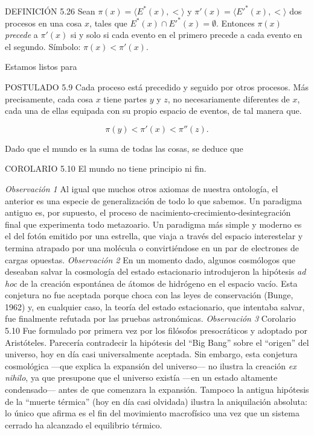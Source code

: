 \begin{justifying}
    \bigskip

    \noindent DEFINICIÓN 5.26 Sean $\pi(x)=\langle E^*(x), < \rangle$ y 
    $\pi'(x)=\langle E'^*(x), < \rangle$ dos procesos en una cosa $x$, tales que 
    $E^*(x) \cap E'^*(x) = \emptyset$. Entonces $\pi(x)$ \textit{precede} a 
    $\pi'(x)$ si y solo si cada evento en el primero precede a cada evento en el 
    segundo. Símbolo: $\pi(x) < \pi'(x)$.

    Estamos listos para

    \bigskip

    \noindent POSTULADO 5.9 Cada proceso está precedido y seguido por otros procesos. 
    Más precisamente, cada cosa $x$ tiene partes $y$ y $z$, no necesariamente diferentes de $x$, 
    cada una de ellas equipada con su propio espacio de eventos, de tal manera que.

    \[
        \pi(y) < \pi'(x) < \pi''(z).
    \]

    Dado que el mundo es la suma de todas las cosas, se deduce que

    \bigskip

    \noindent COROLARIO 5.10 El mundo no tiene principio ni fin.

    \textit{Observación 1} Al igual que muchos otros axiomas de nuestra ontología, el anterior
    es una especie de generalización de todo lo que sabemos. Un paradigma antiguo es,
    por supuesto, el proceso de nacimiento-crecimiento-desintegración final que experimenta todo metazoario. 
    Un paradigma más simple y moderno es el del fotón emitido por una estrella, que viaja a través del espacio interestelar y termina
    atrapado por una molécula o convirtiéndose en un par de electrones de cargas opuestas.
    \textit{Observación 2} En un momento dado, algunos cosmólogos que deseaban salvar la cosmología del estado 
    estacionario introdujeron la hipótesis \textit{ad hoc} de la creación espontánea de átomos de hidrógeno en el espacio vacío. 
    Esta conjetura no fue aceptada porque choca con las leyes de conservación (Bunge, 1962) y, en cualquier caso, 
    la teoría del estado estacionario, que intentaba salvar, fue finalmente refutada por las pruebas astronómicas.
    \textit{Observación 3} Corolario 5.10 Fue formulado por primera vez por los filósofos presocráticos y adoptado por Aristóteles. 
    Parecería contradecir la hipótesis del ``Big Bang'' sobre el ``origen'' del universo, hoy en día casi universalmente aceptada. 
    Sin embargo, esta conjetura cosmológica —que explica la expansión del universo— no ilustra la creación \textit{ex nihilo}, ya que presupone que
    el universo existía —en un estado altamente condensado— antes de que comenzara la expansión. Tampoco la antigua hipótesis 
    de la ``muerte térmica'' (hoy en día casi olvidada) ilustra la aniquilación absoluta: lo único que afirma es el fin del movimiento macrofísico 
    una vez que un sistema cerrado ha alcanzado el equilibrio térmico.


\end{justifying}
